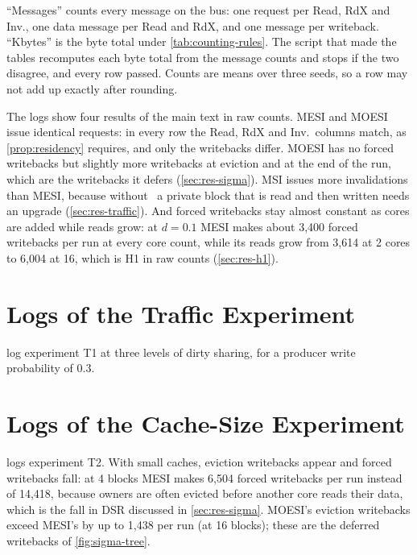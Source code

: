 ``Messages'' counts every message on the bus: one request per Read, RdX and
Inv., one data message per Read and RdX, and one message per writeback.
``Kbytes'' is the byte total under \cref{tab:counting-rules}. The script that made
the tables recomputes each byte total from the message counts and stops if the two
disagree, and every row passed. Counts are means over three seeds, so a row may not
add up exactly after rounding.

The logs show four results of the main text in raw counts. MESI and MOESI issue
identical requests: in every row the Read, RdX and Inv.\ columns match, as
\cref{prop:residency} requires, and only the writebacks differ. MOESI has no forced
writebacks but slightly more writebacks at eviction and at the end of the run,
which are the writebacks it defers (\cref{sec:res-sigma}). MSI issues more
invalidations than MESI, because without \stE\ a private block that is read and then
written needs an upgrade (\cref{sec:res-traffic}). And forced writebacks stay almost
constant as cores are added while reads grow: at $d=0.1$ MESI makes about 3,400
forced writebacks per run at every core count, while its reads grow from 3,614 at 2
cores to 6,004 at 16, which is H1 in raw counts (\cref{sec:res-h1}).

\section{Logs of the Traffic Experiment}
\label{sec:log-t1}
%

 log experiment T1 at
three levels of dirty sharing, for a producer write probability of 0.3.

\section{Logs of the Cache-Size Experiment}
\label{sec:log-t2}
%

 logs experiment T2. With small caches, eviction writebacks
appear and forced writebacks fall: at 4 blocks MESI makes 6,504 forced writebacks
per run instead of 14,418, because owners are often evicted before another core
reads their data, which is the fall in DSR discussed in \cref{sec:res-sigma}.
MOESI's eviction writebacks exceed MESI's by up to 1,438 per run (at 16 blocks);
these are the deferred writebacks of \cref{fig:sigma-tree}.



